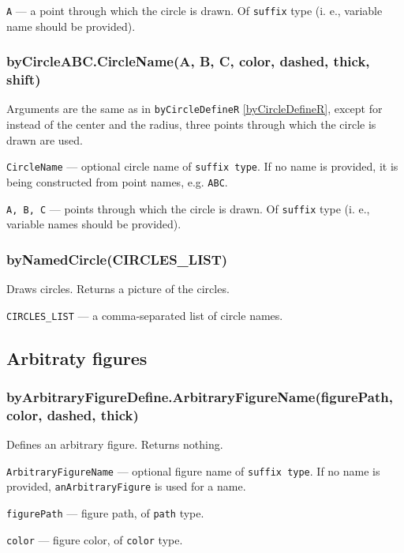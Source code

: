 \documentclass{ltxdoc}
\begin{document}
	\texttt{A} — a point through which the circle is drawn. Of \texttt{suffix} type (i. e., variable name should be provided).

\subsubsection{byCircleABC.CircleName(A, B, C, color, dashed, thick, shift)}\label{byCircleABC}
	
	Arguments are the same as in \texttt{byCircleDefineR} \ref{byCircleDefineR}, except for instead of the center and the radius, three points through which the circle is drawn are used.
	
	\texttt{CircleName} — optional circle name of \texttt{suffix type}. If no name is provided, it is being constructed from point names, e.g. \texttt{ABC}.
	
	\texttt{A, B, C} — points through which the circle is drawn. Of \texttt{suffix} type (i. e., variable names should be provided).


\subsubsection{byNamedCircle(CIRCLES\_LIST)}\label{byNamedCircle}
	
	Draws circles. Returns a picture of the circles.
	
	\texttt{CIRCLES\_LIST} — a comma-separated list of circle names.

\subsection{Arbitraty figures}

\subsubsection{byArbitraryFigureDefine.ArbitraryFigureName(figurePath, color, dashed, thick)}\label{byArbitraryFigureDefine}
	
	Defines an arbitrary figure. Returns nothing.
	
	\texttt{ArbitraryFigureName} — optional figure name of \texttt{suffix type}. If no name is provided, \texttt{anArbitraryFigure} is used for a name.
	
	\texttt{figurePath} — figure path, of \texttt{path} type.
	
	\texttt{color} — figure color, of \texttt{color} type.
	
\end{document}
